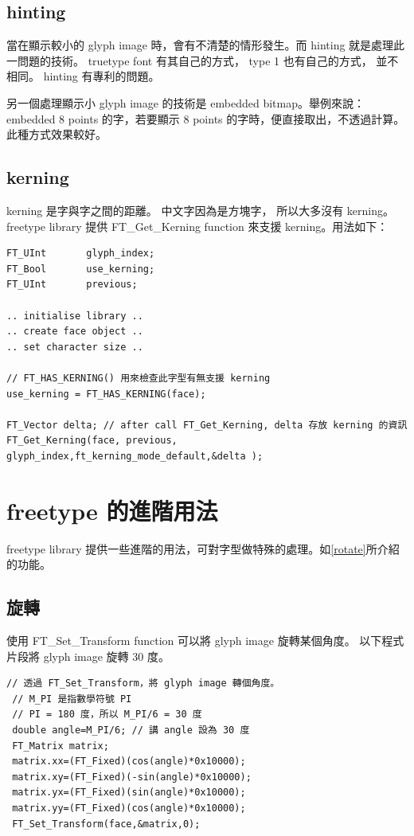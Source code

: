 \documentclass[12pt,a4]{article}
\begin{document}
\begin{CJK}{UTF8}{cwmu}
\subsection{hinting}
當在顯示較小的 glyph image 時，會有不清楚的情形發生。而 hinting
就是處理此一問題的技術。 truetype font 有其自己的方式， type 1 也有自己的方式，
並不相同。 hinting 有專利的問題。

另一個處理顯示小 glyph image 的技術是 embedded bitmap。舉例來說： embedded 8 points
的字，若要顯示 8 points 的字時，便直接取出，不透過計算。此種方式效果較好。
\subsection{kerning}
kerning 是字與字之間的距離。 中文字因為是方塊字， 所以大多沒有 kerning。
freetype library 提供 FT\_{}Get\_{}Kerning function
來支援 kerning。用法如下：
\begin{Verbatim}[commandchars=@\$?]
FT_UInt       glyph_index;
FT_Bool       use_kerning;
FT_UInt       previous;

.. initialise library ..
.. create face object ..
.. set character size ..

// FT_HAS_KERNING() 用來檢查此字型有無支援 kerning
use_kerning = FT_HAS_KERNING(face);

FT_Vector delta; // after call FT_Get_Kerning, delta 存放 kerning 的資訊
FT_Get_Kerning(face, previous, glyph_index,ft_kerning_mode_default,&delta );
\end{Verbatim}
\newpage
\section{freetype 的進階用法}
freetype library 提供一些進階的用法，可對字型做特殊的處理。如\ref{rotate}所介紹的功能。
\subsection{\label{rotate}旋轉}
使用 FT\_{}Set\_{}Transform function 可以將 glyph image 旋轉某個角度。
以下程式片段將 glyph image 旋轉 30 度。
\begin{Verbatim}[commandchars=+!?]
 // 透過 FT_Set_Transform，將 glyph image 轉個角度。
 // M_PI 是指數學符號 PI
 // PI = 180 度，所以 M_PI/6 = 30 度
 double angle=M_PI/6; // 講 angle 設為 30 度
 FT_Matrix matrix;
 matrix.xx=(FT_Fixed)(cos(angle)*0x10000);
 matrix.xy=(FT_Fixed)(-sin(angle)*0x10000);
 matrix.yx=(FT_Fixed)(sin(angle)*0x10000);
 matrix.yy=(FT_Fixed)(cos(angle)*0x10000);
 FT_Set_Transform(face,&matrix,0);
\end{Verbatim}


\end{CJK}
\end{document}
